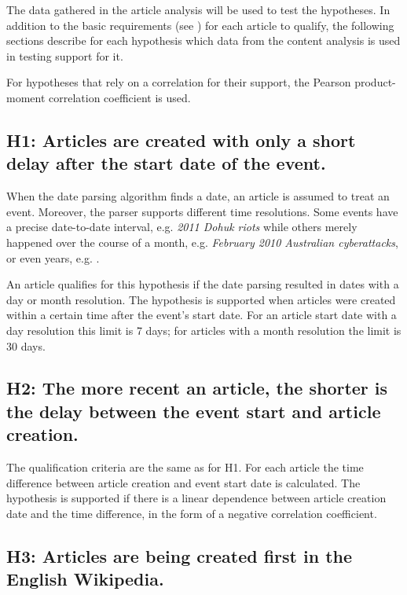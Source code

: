 The data gathered in the article analysis will be used to test the hypotheses.
In addition to the basic requirements (see ) for each article to qualify, the following sections describe for each hypothesis which data from the content analysis is used in testing support for it.

For hypotheses that rely on a correlation for their support, the Pearson product-moment correlation coefficient is used.

\subsection*{H1: Articles are created with only a short delay after the start date of the event.}

When the date parsing algorithm finds a date, an article is assumed to treat an event.
Moreover, the parser supports different time resolutions.
Some events have a precise date-to-date interval, e.g. \emph{2011 Dohuk riots} while others merely happened over the course of a month, e.g. \emph{February 2010 Australian cyberattacks}, or even years, e.g. .

An article qualifies for this hypothesis if the date parsing resulted in dates with a day or month resolution.
The hypothesis is supported when articles were created within a certain time after the event's start date.
For an article start date with a day resolution this limit is 7 days; for articles with a month resolution the limit is 30 days.

\subsection*{H2: The more recent an article, the shorter is the delay between the event start and article creation.}

The qualification criteria are the same as for H1. 
For each article the time difference between article creation and event start date is calculated. 
The hypothesis is supported if there is a linear dependence between article creation date and the time difference, in the form of a negative correlation coefficient.

\subsection*{H3: Articles are being created first in the English Wikipedia.}

